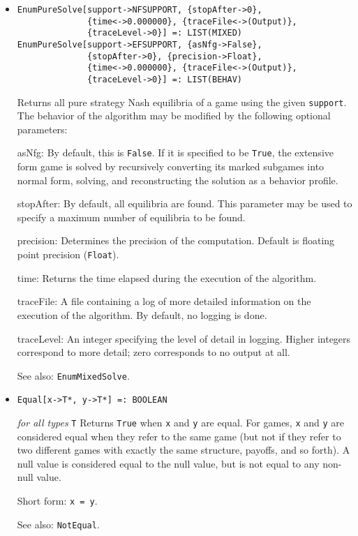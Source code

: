 \begin{itemize}
\item{}
\protect \large \begin{verbatim}
EnumPureSolve[support->NFSUPPORT, {stopAfter->0}, 
              {time<->0.000000}, {traceFile<->(Output)},
              {traceLevel->0}] =: LIST(MIXED) 
EnumPureSolve[support->EFSUPPORT, {asNfg->False}, 
              {stopAfter->0}, {precision->Float}, 
              {time<->0.000000}, {traceFile<->(Output)}, 
              {traceLevel->0}] =: LIST(BEHAV) 
\end{verbatim}\normalsize

\bd
Returns all pure strategy Nash equilibria of a game using the given
\verb+support+.  The behavior
of the algorithm may be modified by the following optional parameters:
\bd
\item
[asNfg:] By default, this is \verb+False+.  If it is specified to be
\verb+True+, the extensive form game is solved by recursively converting
its marked subgames into normal form, solving, and reconstructing the
solution as a behavior profile.
\item
[stopAfter:] By default, all equilibria are found.  This parameter may
be used to specify a maximum number of equilibria to be found.
\item
[precision:] Determines the precision of the computation. Default is
floating point precision (\verb+Float+). 
\item
[time:] Returns the time elapsed during the execution
of the algorithm.
\item
[traceFile:] A file containing a log of more detailed information on the
execution of the algorithm.  By default, no logging is done.
\item
[traceLevel:] An integer specifying the level of detail in logging.  Higher
integers correspond to more detail; zero corresponds to no output at all.
\ed
\item
[See also:] \verb+EnumMixedSolve+.
\ed

\item{}
\protect \large \begin{verbatim}
Equal[x->T*, y->T*] =: BOOLEAN
\end{verbatim}\normalsize

{\it for all types} {\tt T}
\bd
Returns \verb+True+ when \verb+x+ and \verb+y+ are equal.  For games,
\verb+x+ and \verb+y+ are considered equal when they refer to the same
game (but not if they refer to two different games with exactly the
same structure, payoffs, and so forth).  A null value is considered equal
to the null value, but is not equal to any non-null value.
\item
[Short form:] \verb+x = y+.
\item
[See also:] \verb+NotEqual+.
\ed


\end{itemize}
